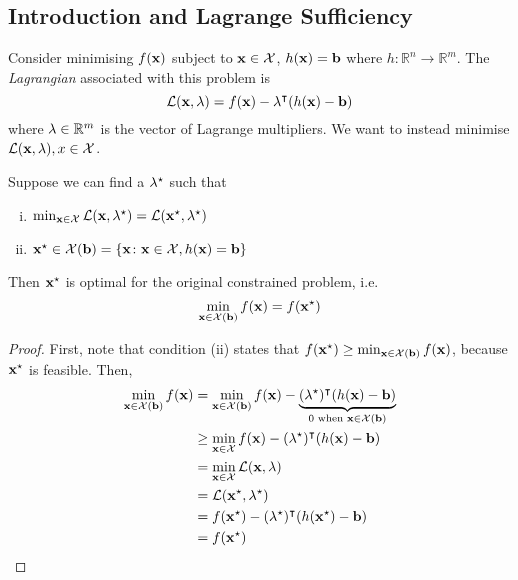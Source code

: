 \subsection{Introduction and Lagrange Sufficiency}
Consider minimising \(f(\vb x)\) subject to \(\vb x \in \mathcal X\), \(h(\vb x) = \vb b\) where \(h \colon \mathbb R^n \to \mathbb R^m\).
The \textit{Lagrangian} associated with this problem is
\[
	\mathcal L(\vb x, \vb \lambda) = f(\vb x) - \vb \lambda^\intercal(h(\vb x) - \vb b)
\]
where \(\vb\lambda \in \mathbb R^m\) is the vector of Lagrange multipliers.
We want to instead minimise \(\mathcal L(\vb x, \vb \lambda), x \in \mathcal X\).
\begin{theorem}
	Suppose we can find a \(\vb \lambda^\star\) such that
	\begin{enumerate}[(i)]
		\item \(\min_{\vb x \in \mathcal X} \mathcal L(\vb x, \vb \lambda^\star) = \mathcal L(\vb x^\star, \vb\lambda^\star)\)
		\item \(\vb x^\star \in \mathcal X(\vb b) = \qty{\vb x \colon \vb x \in \mathcal X, h(\vb x) = \vb b}\)
	\end{enumerate}
	Then \(\vb x^\star\) is optimal for the original constrained problem, i.e.
	\[
		\min_{\vb x \in \mathcal X(\vb b)} f(\vb x) = f(\vb x^\star)
	\]
\end{theorem}
\begin{proof}
	First, note that condition (ii) states that \(f(\vb x^\star) \geq \min_{\vb x \in \mathcal X(\vb b)}f(\vb x)\), because \(\vb x^\star\) is feasible.
	Then,
	\begin{align*}
		\min_{\vb x \in \mathcal X(\vb b)}f(\vb x) & = \min_{\vb x \in \mathcal X(\vb b)} f(\vb x) - \underbrace{(\vb\lambda^\star)^\intercal (h(\vb x) - \vb b)}_{0 \text{ when } \vb x \in \mathcal X(\vb b)} \\
		                                           & \geq \min_{\vb x \in \mathcal X} f(\vb x) - (\vb\lambda^\star)^\intercal (h(\vb x) - \vb b)                                                                \\
		                                           & = \min_{\vb x \in \mathcal X} \mathcal L(\vb x, \vb \lambda)                                                                                                \\
		                                           & = \mathcal L(\vb x^\star, \vb \lambda^\star)                                                                                                                \\
		                                           & = f(\vb x^\star) - (\vb\lambda^\star)^\intercal (h(\vb x^\star) - \vb b)                                                                                   \\
		                                           & = f(\vb x^\star)
	\end{align*}
\end{proof}


